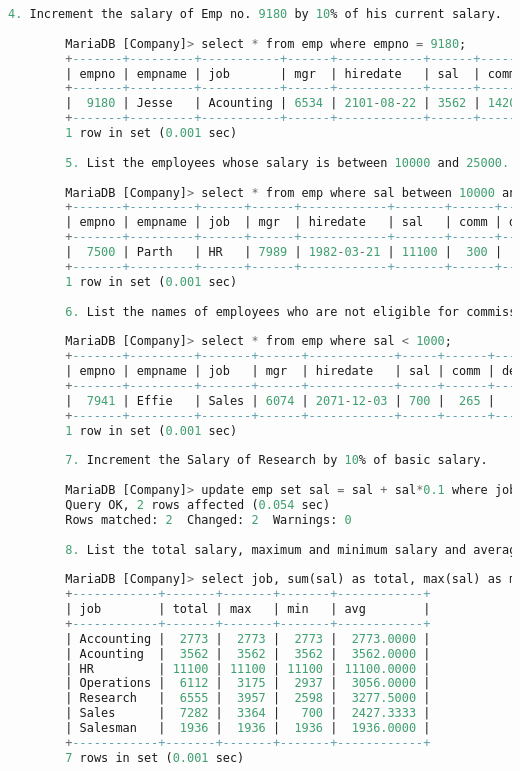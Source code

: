 \documentclass{article}
\begin{document}
\begin{lstlisting}[language=SQL]
		4. Increment the salary of Emp no. 9180 by 10% of his current salary. 
		
		MariaDB [Company]> select * from emp where empno = 9180; 
		+-------+---------+-----------+------+------------+------+------+--------+ 
		| empno | empname | job       | mgr  | hiredate   | sal  | comm | deptno | 
		+-------+---------+-----------+------+------------+------+------+--------+ 
		|  9180 | Jesse   | Acounting | 6534 | 2101-08-22 | 3562 | 1420 |     10 | 
		+-------+---------+-----------+------+------------+------+------+--------+ 
		1 row in set (0.001 sec) 
		
		5. List the employees whose salary is between 10000 and 25000. 
		
		MariaDB [Company]> select * from emp where sal between 10000 and 25000; 
		+-------+---------+------+------+------------+-------+------+--------+ 
		| empno | empname | job  | mgr  | hiredate   | sal   | comm | deptno | 
		+-------+---------+------+------+------------+-------+------+--------+ 
		|  7500 | Parth   | HR   | 7989 | 1982-03-21 | 11100 |  300 |     60 | 
		+-------+---------+------+------+------------+-------+------+--------+ 
		1 row in set (0.001 sec) 
		
		6. List the names of employees who are not eligible for commission. 
		
		MariaDB [Company]> select * from emp where sal < 1000; 
		+-------+---------+-------+------+------------+-----+------+--------+ 
		| empno | empname | job   | mgr  | hiredate   | sal | comm | deptno | 
		+-------+---------+-------+------+------------+-----+------+--------+ 
		|  7941 | Effie   | Sales | 6074 | 2071-12-03 | 700 |  265 |     30 | 
		+-------+---------+-------+------+------------+-----+------+--------+ 
		1 row in set (0.001 sec) 
		
		7. Increment the Salary of Research by 10% of basic salary. 
		
		MariaDB [Company]> update emp set sal = sal + sal*0.1 where job = "Research"; 
		Query OK, 2 rows affected (0.054 sec) 
		Rows matched: 2  Changed: 2  Warnings: 0 
		
		8. List the total salary, maximum and minimum salary and average salary of the employees jobwise. 
		
		MariaDB [Company]> select job, sum(sal) as total, max(sal) as max, min(sal) as min, avg(sal) as avg from emp group by job; 
		+------------+-------+-------+-------+------------+ 
		| job        | total | max   | min   | avg        | 
		+------------+-------+-------+-------+------------+ 
		| Accounting |  2773 |  2773 |  2773 |  2773.0000 | 
		| Acounting  |  3562 |  3562 |  3562 |  3562.0000 | 
		| HR         | 11100 | 11100 | 11100 | 11100.0000 | 
		| Operations |  6112 |  3175 |  2937 |  3056.0000 | 
		| Research   |  6555 |  3957 |  2598 |  3277.5000 | 
		| Sales      |  7282 |  3364 |   700 |  2427.3333 | 
		| Salesman   |  1936 |  1936 |  1936 |  1936.0000 | 
		+------------+-------+-------+-------+------------+ 
		7 rows in set (0.001 sec) 
		

\end{lstlisting}
\end{document}
